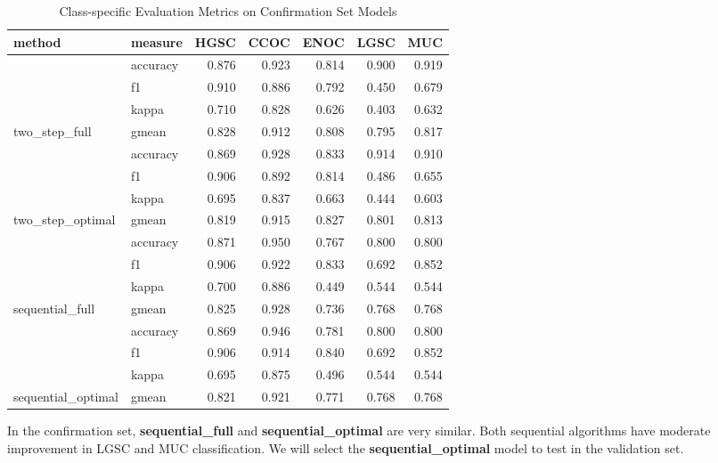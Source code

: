 \documentclass[
]{report}
\begin{document}
\begin{table}

\caption{\label{tab:conf-eval-per-class}Class-specific Evaluation Metrics on Confirmation Set Models}
\centering
\begin{tabular}[t]{l|l|r|r|r|r|r}
\hline
method & measure & HGSC & CCOC & ENOC & LGSC & MUC\\
\hline
 & accuracy & 0.876 & 0.923 & 0.814 & 0.900 & 0.919\\
\cline{2-7}
 & f1 & 0.910 & 0.886 & 0.792 & 0.450 & 0.679\\
\cline{2-7}
 & kappa & 0.710 & 0.828 & 0.626 & 0.403 & 0.632\\
\cline{2-7}
\multirow{-4}{*}{\raggedright\arraybackslash two\_step\_full} & gmean & 0.828 & 0.912 & 0.808 & 0.795 & 0.817\\
\cline{1-7}
 & accuracy & 0.869 & 0.928 & 0.833 & 0.914 & 0.910\\
\cline{2-7}
 & f1 & 0.906 & 0.892 & 0.814 & 0.486 & 0.655\\
\cline{2-7}
 & kappa & 0.695 & 0.837 & 0.663 & 0.444 & 0.603\\
\cline{2-7}
\multirow{-4}{*}{\raggedright\arraybackslash two\_step\_optimal} & gmean & 0.819 & 0.915 & 0.827 & 0.801 & 0.813\\
\cline{1-7}
 & accuracy & 0.871 & 0.950 & 0.767 & 0.800 & 0.800\\
\cline{2-7}
 & f1 & 0.906 & 0.922 & 0.833 & 0.692 & 0.852\\
\cline{2-7}
 & kappa & 0.700 & 0.886 & 0.449 & 0.544 & 0.544\\
\cline{2-7}
\multirow{-4}{*}{\raggedright\arraybackslash sequential\_full} & gmean & 0.825 & 0.928 & 0.736 & 0.768 & 0.768\\
\cline{1-7}
 & accuracy & 0.869 & 0.946 & 0.781 & 0.800 & 0.800\\
\cline{2-7}
 & f1 & 0.906 & 0.914 & 0.840 & 0.692 & 0.852\\
\cline{2-7}
 & kappa & 0.695 & 0.875 & 0.496 & 0.544 & 0.544\\
\cline{2-7}
\multirow{-4}{*}{\raggedright\arraybackslash sequential\_optimal} & gmean & 0.821 & 0.921 & 0.771 & 0.768 & 0.768\\
\hline
\end{tabular}
\end{table}

In the confirmation set, \textbf{sequential\_full} and \textbf{sequential\_optimal} are very similar. Both sequential algorithms have moderate improvement in LGSC and MUC classification. We will select the \textbf{sequential\_optimal} model to test in the validation set.
\end{document}
